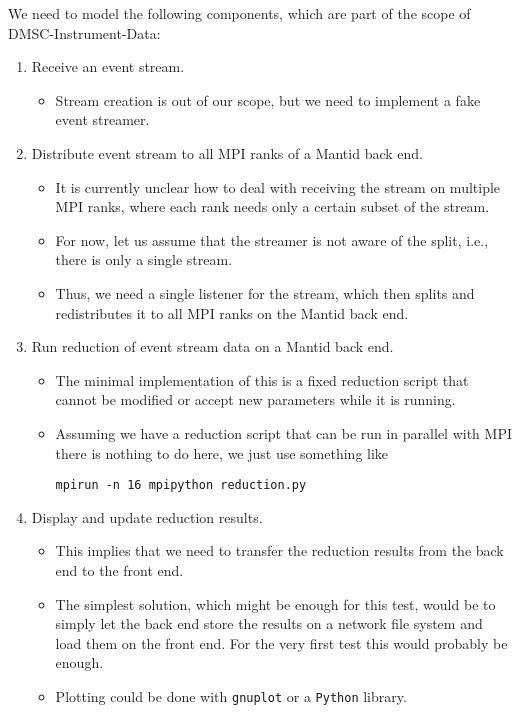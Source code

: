 \documentclass[a4paper,english,numbers=noenddot,bibliography=totoc,chapterprefix=on,DIV=12]{scrartcl}
\begin{document}
We need to model the following components, which are part of the scope of DMSC-Instrument-Data:
\begin{enumerate}
  \item Receive an event stream.
    \begin{itemize}
      \item Stream creation is out of our scope, but we need to implement a fake event streamer.
    \end{itemize}
  \item Distribute event stream to all MPI ranks of a Mantid back end.
    \begin{itemize}
      \item It is currently unclear how to deal with receiving the stream on multiple MPI ranks, where each rank needs only a certain subset of the stream.
      \item For now, let us assume that the streamer is not aware of the split, i.e., there is only a single stream.
      \item Thus, we need a single listener for the stream, which then splits and redistributes it to all MPI ranks on the Mantid back end.
    \end{itemize}
  \item Run reduction of event stream data on a Mantid back end.
    \begin{itemize}
      \item The minimal implementation of this is a fixed reduction script that cannot be modified or accept new parameters while it is running.
      \item Assuming we have a reduction script that can be run in parallel with MPI there is nothing to do here, we just use something like
        \begin{verbatim}
mpirun -n 16 mpipython reduction.py
        \end{verbatim}
    \end{itemize}
  \item Display and update reduction results.
    \begin{itemize}
      \item This implies that we need to transfer the reduction results from the back end to the front end.
      \item The simplest solution, which might be enough for this test, would be to simply let the back end store the results on a network file system and load them on the front end.
        For the very first test this would probably be enough.
      \item Plotting could be done with \texttt{gnuplot} or a \texttt{Python} library.

\end{itemize}
\end{enumerate}
\end{document}
